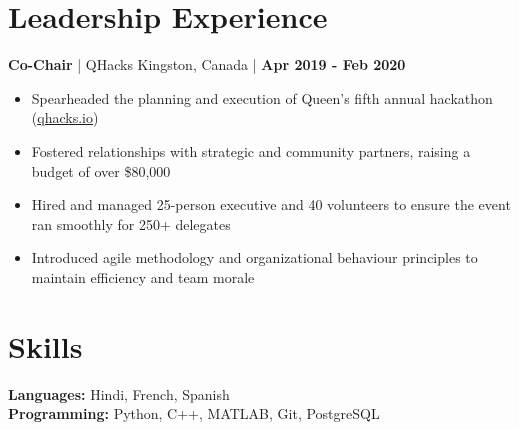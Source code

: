 \documentclass[11pt]{article}
\newcommand{\jobentry}[4]%
{
\vspace{-0.1em} \noindent
{\large {\bfseries #1} | #2}
\hfill
#3 {\large | {\bfseries #4}}
\vspace{-0.25em}
}%
\newcommand{\projentry}[2]%
{
\vspace{-0.1em} \noindent
{\large
    {\bfseries #1}
    \hfill
    {\bfseries #2}
}
\vspace{-0.25em}
}%
\begin{document}

\section{Leadership Experience}%
\jobentry{Co-Chair}{QHacks}{Kingston, Canada}{Apr 2019 - Feb 2020}
\begin{itemize}%
    \item Spearheaded the planning and execution of Queen’s fifth annual hackathon (\href{https://qhacks.io}{qhacks.io})
    \item Fostered relationships with strategic and community partners, raising a budget of over \$80,000
    \item Hired and managed 25-person executive and 40 volunteers to ensure the event ran smoothly for 250+ delegates
    \item Introduced agile methodology and organizational behaviour principles to maintain efficiency and team morale
\end{itemize}%

\section{Skills}%
\noindent
{\bfseries Languages:}
Hindi, French, Spanish \\
{\bfseries Programming:}
Python, C++, MATLAB, Git, PostgreSQL%
\vspace{0.5em}
\end{document}
